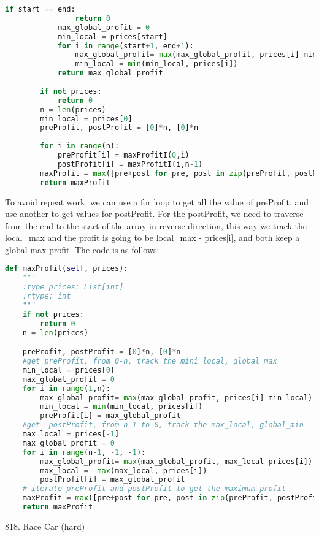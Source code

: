\documentclass[../main.tex]{subfiles}
\begin{document}
\begin{examples}[resume]
\begin{lstlisting}[language=Python]
            if start == end:
                return 0
            max_global_profit = 0
            min_local = prices[start]
            for i in range(start+1, end+1):
                max_global_profit= max(max_global_profit, prices[i]-min_local)
                min_local = min(min_local, prices[i])
            return max_global_profit
        
        if not prices:
            return 0
        n = len(prices)
        min_local = prices[0]
        preProfit, postProfit = [0]*n, [0]*n
    
        for i in range(n):
            preProfit[i] = maxProfitI(0,i)
            postProfit[i] = maxProfitI(i,n-1)
        maxProfit = max([pre+post for pre, post in zip(preProfit, postProfit)])
        return maxProfit
\end{lstlisting}
To avoid repeat work, we can use a for loop to get all the value of preProfit, and use another to get values for postProfit. For the postProfit, we need to traverse from the end to the start of the array in reverse direction, this way we track the local\_max and the profit is going to be local\_max - prices[i], and both keep a global max profit. The code is as follows:
\begin{lstlisting}[language = Python]
def maxProfit(self, prices):
    """
    :type prices: List[int]
    :rtype: int
    """        
    if not prices:
        return 0
    n = len(prices)

    preProfit, postProfit = [0]*n, [0]*n
    #get preProfit, from 0-n, track the mini_local, global_max
    min_local = prices[0]
    max_global_profit = 0
    for i in range(1,n):
        max_global_profit= max(max_global_profit, prices[i]-min_local)
        min_local = min(min_local, prices[i])
        preProfit[i] = max_global_profit
    #get  postProfit, from n-1 to 0, track the max_local, global_min
    max_local = prices[-1]
    max_global_profit = 0
    for i in range(n-1, -1, -1):
        max_global_profit= max(max_global_profit, max_local-prices[i])
        max_local =  max(max_local, prices[i])
        postProfit[i] = max_global_profit
    # iterate preProfit and postProfit to get the maximum profit
    maxProfit = max([pre+post for pre, post in zip(preProfit, postProfit)])
    return maxProfit
\end{lstlisting}

818. Race Car (hard)
\end{examples}

\end{document}
